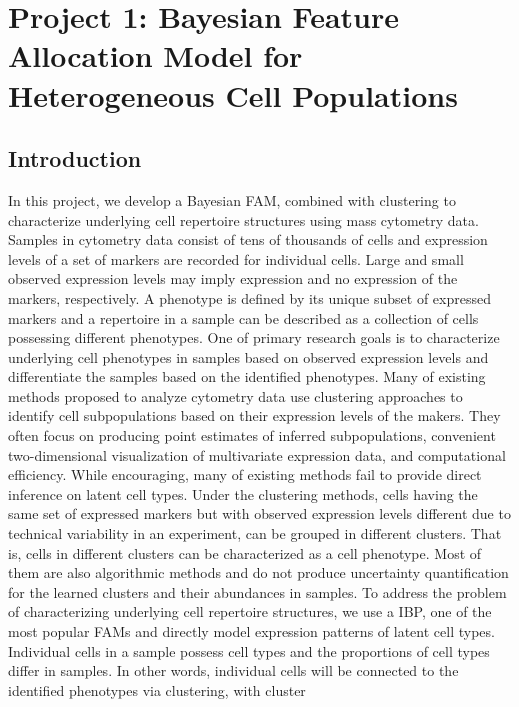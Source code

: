 \documentclass[12pt,]{article}
\begin{document}
\section{Project 1: Bayesian Feature Allocation Model for Heterogeneous Cell Populations}\label{sec:proj1}
\subsection{Introduction}


In this project, we develop a Bayesian FAM, combined with clustering to characterize underlying cell repertoire structures using mass cytometry data. Samples in cytometry data consist of tens of thousands of cells and expression levels of a set of markers are recorded for individual cells. Large and small observed expression levels may imply expression and no expression of the markers, respectively.  A phenotype is defined by its unique subset of expressed markers and a repertoire in a sample can be described as a collection of cells possessing different phenotypes.  One of primary research goals is to characterize underlying cell phenotypes in samples based on observed expression levels and differentiate the samples based on the identified phenotypes.  Many of existing methods proposed to analyze cytometry data use clustering approaches to identify cell subpopulations based on their expression levels of the makers.  They often focus on
producing point estimates of inferred subpopulations, convenient two-dimensional visualization of multivariate expression data, and
computational efficiency. 
While encouraging, many of existing methods fail to provide direct inference on
latent cell types.  Under the clustering methods, cells having the same set of
expressed markers but with observed expression levels different due to
technical variability in an experiment, can be grouped in different clusters.
That is, cells in different clusters can be characterized as a cell phenotype.
Most of them are also algorithmic methods and do not produce uncertainty
quantification for the learned clusters and their abundances in samples.  To
address the problem of characterizing underlying cell repertoire structures, we
use a IBP, one of the most popular FAMs and directly model expression patterns
of latent cell types.   Individual cells in a sample possess cell types and the
proportions of cell types differ in samples. In other words, individual cells
will be connected to the identified phenotypes via clustering, with cluster
\end{document}
